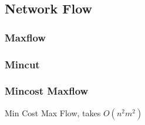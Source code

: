 \documentclass[10pt]{article}{\twocolumn}
\begin{document}
\subsection{Network Flow}

\subsubsection{Maxflow}

\subsubsection{Mincut}

\subsubsection{Mincost Maxflow}
Min Cost Max Flow, takes $O(n^2m^2)$
\end{document}
